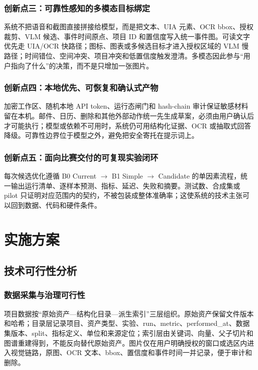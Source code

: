 \documentclass[UTF8,12pt]{ctexart}
\begin{document}
\subsubsection{创新点三：可靠性感知的多模态目标绑定}
系统不把语音和截图直接拼接给模型，而是把文本、UIA 元素、OCR bbox、授权裁剪、VLM 候选、事件时间原点、项目 ID 和置信度写入统一事件图。可读文字优先走 UIA/OCR 快路径；图标、图表或多候选目标才进入授权区域的 VLM 慢路径；时间错位、空间冲突、项目冲突和低置信度触发澄清。多模态因此参与“用户指向了什么”的决策，而不是只增加一张图片。

\subsubsection{创新点四：本地优先、可恢复和确认式产物}
加密工作区、随机本地 API token、运行态闸门和 hash-chain 审计保证敏感材料留在本机。邮件、日历、删除和其他外部动作统一先生成草案，必须由用户确认后才可能执行；模型或依赖不可用时，系统仍可用结构化证据、OCR 或抽取式回答降级。可靠性边界位于模型之外，避免把安全寄托在提示词上。

\subsubsection{创新点五：面向比赛交付的可复现实验闭环}
每次候选优化遵循 B0 Current $\rightarrow$ B1 Simple $\rightarrow$ Candidate 的单因素流程，统一输出运行清单、逐样本预测、指标、延迟、失败和摘要。测试数、合成集或 pilot 只证明对应范围内的契约，不被包装成整体准确率；这使系统的技术主张可以回到数据、代码和硬件条件。

\section{实施方案}

\subsection{技术可行性分析}

\subsubsection{数据采集与治理可行性}
项目数据按“原始资产—结构化目录—派生索引”三层组织。原始资产保留文件版本和哈希；目录层记录项目、资产类型、实验、run、metric、performed\_at、数据集版本、split、指标定义、单位和来源定位；索引层由关键词、向量、父子切片和图谱重建得到，不能反向替代原始资产。图片仅在用户明确授权的窗口或选区内进入视觉链路，原图、OCR 文本、bbox、置信度和事件时间一并记录，便于审计和删除。
\end{document}
